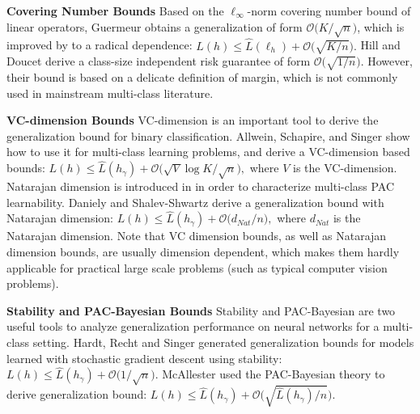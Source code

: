 \documentclass{article}
\newtheorem{remark}{Remark}
\begin{document}
\textbf{Covering Number Bounds}
Based on the $\ell_\infty$-norm covering number bound of
linear operators, Guermeur \cite{guermeur2002combining} obtains
a generalization of form $\mathcal{O}\big({K}/{\sqrt{n}}\big)$,
which is improved by \cite{zhang2004statistical} to a radical dependence:
  $
   L(h)\leq  \hat{L}(\ell_h) +\mathcal{O}\big(\sqrt{{K}/{n}}\big).
$
Hill and Doucet \cite{Hill2007} derive a class-size independent risk guarantee
of form $\mathcal{O}\big(\sqrt{{1}/{n}}\big)$.
However, their bound is based on a delicate definition of margin,
which is not commonly used in mainstream multi-class literature.

\textbf{VC-dimension Bounds}
VC-dimension is an important tool to derive the generalization bound for binary classification.
Allwein, Schapire, and Singer \cite{allwein2000reducing} show how to use it
for multi-class learning problems,
and derive a VC-dimension based bounds:
$
   L(h)\leq  \hat{L}(h_\gamma) +\mathcal{O}\big({\sqrt{V}\log K}/{\sqrt{n}}\big),
$
where $V$ is the VC-dimension.
Natarajan dimension is introduced in \cite{Natarajan1989} in
order to characterize multi-class PAC learnability.
Daniely and Shalev-Shwartz \cite{daniely2014optimal} derive a generalization bound with Natarajan dimension:
$
   L(h)\leq  \hat{L}(h_\gamma) +\mathcal{O}\big({d_{Nat}}/{n}\big),
$
where $d_{Nat}$ is the Natarajan dimension.
Note that VC dimension bounds, as well as Natarajan dimension bounds, are usually dimension
dependent, which makes them hardly applicable for practical large
scale problems (such as typical computer vision problems).

\textbf{Stability and PAC-Bayesian Bounds}
Stability \cite{Hardt2016} and PAC-Bayesian \cite{McAllester2013} are two useful tools
to analyze generalization performance on neural networks for a multi-class setting.
Hardt, Recht and Singer \cite{Hardt2016} generated generalization bounds for models learned with stochastic gradient descent using stability:
$
   L(h)\leq  \hat{L}(h_\gamma) +\mathcal{O}\big({1}/{\sqrt{n}}\big).
$
McAllester \cite{McAllester2013} used the PAC-Bayesian theory
to derive generalization bound:
$
   L(h)\leq  \hat{L}(h_\gamma) +\mathcal{O}\big(\sqrt{\hat{L}(h_\gamma)/{n}}\big).
$
\end{document}
